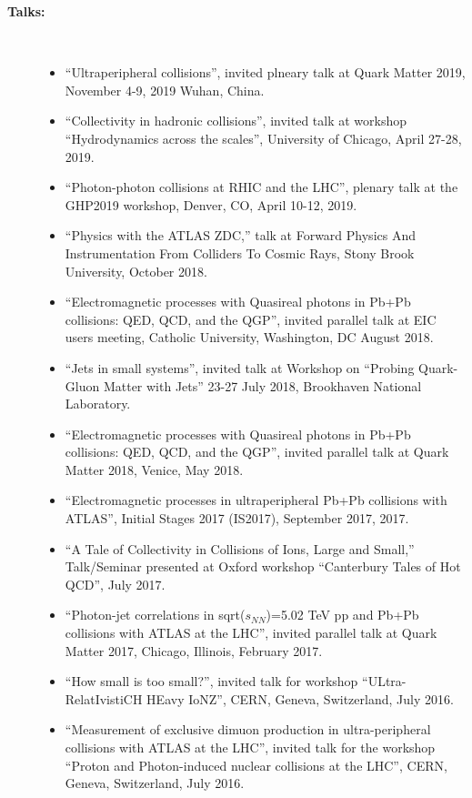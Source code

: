 \documentclass[11 pt]{article}
\begin{document}
\begin{description}

\item[\bf Talks:]\
\begin{itemize}
\item ``Ultraperipheral collisions'', invited plneary talk at Quark Matter 2019, November 4-9, 2019 Wuhan, China.
\item ``Collectivity in hadronic collisions'', invited talk at workshop ``Hydrodynamics across the scales'', University of Chicago, April 27-28, 2019.
\item ``Photon-photon collisions at RHIC and the LHC'', plenary talk at the GHP2019 workshop, Denver, CO, April 10-12, 2019.
\item ``Physics with the ATLAS ZDC,'' talk at Forward Physics And Instrumentation From Colliders To Cosmic Rays, Stony Brook University, October 2018.
\item ``Electromagnetic processes with Quasireal photons in Pb+Pb collisions:  QED, QCD, and the QGP'', invited parallel talk at EIC users meeting, Catholic University, Washington, DC August 2018.
\item ``Jets in small systems'', invited talk at Workshop on ``Probing Quark-Gluon Matter with Jets'' 23-27 July 2018, Brookhaven National Laboratory.
\item ``Electromagnetic processes with Quasireal photons in Pb+Pb collisions:  QED, QCD, and the QGP'', invited parallel talk at Quark Matter 2018, Venice, May 2018.
\item ``Electromagnetic processes in ultraperipheral Pb+Pb collisions with ATLAS'', Initial Stages 2017 (IS2017), September 2017, 2017.
\item ``A Tale of Collectivity in Collisions of Ions, Large and Small,'' Talk/Seminar presented at Oxford workshop ``Canterbury Tales of Hot QCD'', July 2017.
\item ``Photon-jet correlations in sqrt($s_{NN}$)=5.02 TeV pp and Pb+Pb collisions with ATLAS at the LHC'', invited parallel talk at Quark Matter 2017, Chicago, Illinois, February 2017.
\item ``How small is too small?'', invited talk for workshop ``ULtra-RelatIvistiCH HEavy IoNZ'', CERN, Geneva, Switzerland, July 2016.
\item ``Measurement of exclusive dimuon production in ultra-peripheral collisions with ATLAS at the LHC'', invited talk for the workshop ``Proton and Photon-induced nuclear collisions at the LHC'', CERN, Geneva, Switzerland, July 2016.

\end{itemize}
\end{description}
\end{document}
